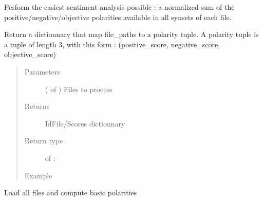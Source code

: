 \documentclass[letterpaper,10pt,english]{sphinxmanual}
\begin{document}
\begin{fulllineitems}
\label{\detokenize{index:loacore.analysis.sentiment_analysis.compute_files_polarity}}
Perform the easiest sentiment analysis possible : a normalized sum of the positive/negative/objective polarities
available in all synsets of each file.

Return a dictionnary that map file\_paths to a polarity tuple. A polarity tuple is a tuple of length 3, with this
form : (positive\_score, negative\_score, objective\_score)
\begin{quote}\begin{description}
\item[{Parameters}] \leavevmode
{} ( of ) \textendash{} Files to process

\item[{Returns}] \leavevmode
IdFile/Scores dictionnary

\item[{Return type}] \leavevmode
{} of  : 

\item[{Example}] \leavevmode
\end{description}\end{quote}

Load all files and compute basic polarities


\end{fulllineitems}
\end{document}
